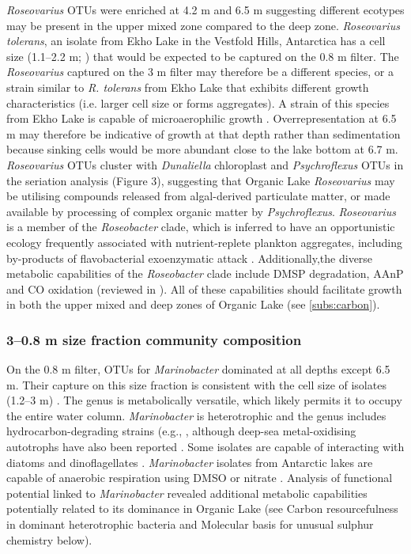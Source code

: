 \emph{Roseovarius} \acp{OTU} were enriched at 4.2 m and 6.5 m suggesting different ecotypes may be present in the upper mixed zone compared to the deep zone. 
\emph{Roseovarius tolerans}, an isolate from Ekho Lake in the Vestfold Hills, Antarctica has a cell size (1.1--2.2 \textmu{}m; \cite{Labrenz1999}) that would be expected to be captured on the 0.8 \textmu{}m filter. 
The \emph{Roseovarius} captured on the 3 \textmu{}m filter may therefore be a different species, or a strain similar to \emph{R. tolerans} from Ekho Lake that exhibits different growth characteristics (i.e. larger cell size or forms aggregates). 
A strain of this species from Ekho Lake is capable of microaerophilic growth \cite{Labrenz1999}. 
Overrepresentation at 6.5 m may therefore be indicative of growth at that depth rather than sedimentation because sinking cells would be more abundant close to the lake bottom at 6.7 m. 
\emph{Roseovarius} \acp{OTU} cluster with \emph{Dunaliella} chloroplast and \emph{Psychroflexus} \acp{OTU} in the seriation analysis (Figure 3), suggesting that Organic Lake \emph{Roseovarius} may be utilising compounds released from algal-derived particulate matter, or made available by processing of complex organic matter by \emph{Psychroflexus}.
\emph{Roseovarius} is a member of the \emph{Roseobacter} clade, which is inferred to have an opportunistic ecology frequently associated with nutrient-replete plankton aggregates, including by-products of flavobacterial exoenzymatic attack \cite{Moran2007a, Teeling2012}. 
Additionally,the diverse metabolic capabilities of the \emph{Roseobacter} clade include \ac{DMSP} degradation, \ac{AAnP} and CO oxidation (reviewed in \citet{Wagner-Dobler2006}). 
All of these capabilities should facilitate growth in both the upper mixed and deep zones of Organic Lake (see \ref{subs:carbon}).

\subsubsection{3--0.8 \textmu{}m size fraction community composition}
On the 0.8 \textmu{}m filter, \acp{OTU} for \emph{Marinobacter} dominated at all depths except 6.5 m. 
Their capture on this size fraction is consistent with the cell size of isolates (1.2--3 \textmu{}m) \cite{Gauthier1992}. 
The genus is metabolically versatile, which likely permits it to occupy the entire water column. 
\emph{Marinobacter} is heterotrophic and the genus includes hydrocarbon-degrading strains (e.g., \citet{Gauthier1992, Huu1999}, although deep-sea metal-oxidising autotrophs have also been reported \cite{Edwards2003}. 
Some isolates are capable of interacting with diatoms \cite{Gardes2010} and dinoflagellates \cite{Green2006}. 
\emph{Marinobacter} isolates from Antarctic lakes are capable of anaerobic respiration using \ac{DMSO} \cite{Matsuzaki2006} or nitrate \cite{Ward1997}. 
Analysis of functional potential linked to \emph{Marinobacter} revealed additional metabolic capabilities potentially related to its dominance in Organic Lake 
(see Carbon resourcefulness in dominant heterotrophic bacteria and Molecular basis for unusual sulphur chemistry below).%

